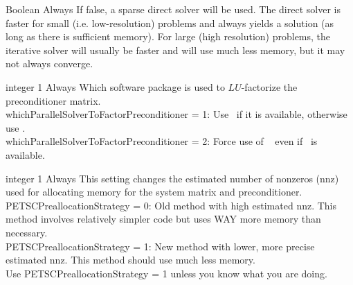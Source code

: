 \myhrule

{Boolean}
{\true}
{Always}
{If false, a sparse direct solver
will be used. The direct solver is faster for small (i.e. low-resolution) problems and always yields a solution
(as long as there is sufficient memory).
For large (high resolution) problems, the iterative solver will usually be faster and will use much
 less memory, but it may not always converge.
}

\myhrule

{integer}
{1}
{Always}
{Which software package is used to $LU$-factorize the preconditioner matrix.\\

{\ttfamily whichParallelSolverToFactorPreconditioner} = 1: Use \mumps~if it is available, otherwise use \superludist.\\

{\ttfamily whichParallelSolverToFactorPreconditioner} = 2: Force use of \superludist~ even if \mumps~is available.
}

\myhrule

{integer}
{1}
{Always}
{This setting changes the estimated number of nonzeros (nnz) used for allocating memory for the system matrix and preconditioner.\\

{\ttfamily PETSCPreallocationStrategy} = 0: Old method with high estimated nnz. This method involves relatively simpler code but uses WAY more memory than necessary.\\

{\ttfamily PETSCPreallocationStrategy} = 1: New method with lower, more precise estimated nnz.  This method should use much less memory.\\

Use {\ttfamily PETSCPreallocationStrategy} = 1 unless you know what you are doing.}


\myhrule

